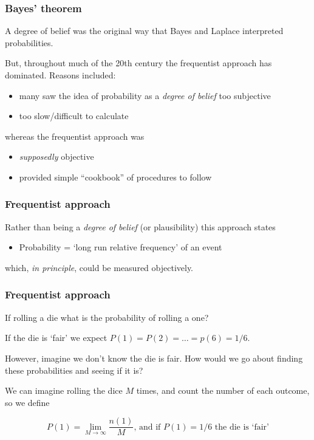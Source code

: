 \begin{frame}

\frametitle{Bayes' theorem}
\label{bayestheorem}

A degree of belief was the original way that Bayes and Laplace interpreted probabilities.

But, throughout much of the 20th century the {\color{red} frequentist approach} has dominated.
Reasons included:

\begin{itemize}
\item many saw the idea of probability as a \emph{degree of belief} too subjective

\item too slow\slash difficult to calculate

\end{itemize}

whereas the frequentist approach was

\begin{itemize}
\item \emph{supposedly} objective

\item provided simple ``cookbook'' of procedures to follow

\end{itemize}

\end{frame}

\begin{frame}

\frametitle{Frequentist approach}
\label{frequentistapproach}

Rather than being a \emph{degree of belief} (or plausibility) this approach states

\begin{itemize}
\item Probability = `long run relative frequency' of an event

\end{itemize}

which, \emph{in principle}, could be measured objectively.

\end{frame}

\begin{frame}

\frametitle{Frequentist approach}
\label{frequentistapproach}

If rolling a die what is the probability of rolling a one?

If the die is `fair' we expect $P(1)=P(2)=\ldots=p(6) = 1/6$.

However, imagine we don't know the die is fair. How would we go about finding these
probabilities and seeing if it is?

We can imagine rolling the dice $M$ times, and count the number of each outcome, so we define

\[
P(1) = \lim_{M\rightarrow\infty} \frac{n(1)}{M}\text{, and if }P(1) = 1/6\text{ the die is `fair'}
\]

\end{frame}

